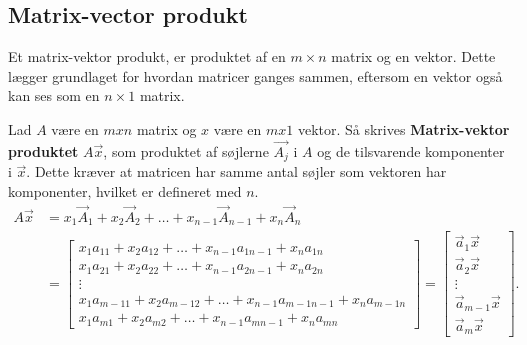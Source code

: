 \subsection{Matrix-vector produkt}
Et matrix-vektor produkt, er produktet af en $m\times n$ matrix og en vektor. Dette lægger grundlaget for hvordan matricer ganges sammen, eftersom en vektor også kan ses som en $n\times1$ matrix. 
\begin{defn}
Lad $A$ være en $mxn$ matrix og $x$ være en $mx1$ vektor. Så skrives \textbf{Matrix-vektor produktet} $A\vec{x}$, som produktet af søjlerne $\vec{A_j}$ i $A$ og de tilsvarende komponenter i $\vec{x}$. Dette kræver at matricen har samme antal søjler som vektoren har komponenter, hvilket er defineret med $n$.
\begin{align*}
A\vec{x}&=x_1\vec{A}_1+x_2\vec{A}_2+ \dots +x_{n-1}\vec{A}_{n-1}+x_n\vec{A}_n \\
&=
\begin{bmatrix}
x_1a_{1 1}+x_2a_{1 2}+\dots +x_{n-1}a_{1 n-1}+x_na_{1 n} \\
x_1a_{2 1}+x_2a_{2 2}+\dots +x_{n-1}a_{2 n-1}+x_na_{2 n}\\
\vdots\\
x_1a_{m-1 1}+x_2a_{m-1 2}+\dots +x_{n-1}a_{m-1 n-1}+x_na_{m-1 n} \\
x_1a_{m 1}+x_2a_{m 2}+\dots +x_{n-1}a_{m n-1}+x_na_{m n}
\end{bmatrix}
=
\begin{bmatrix}
\vec{a}_1\vec{x}\\
\vec{a}_2\vec{x}\\
\vdots\\
\vec{a}_{m-1}\vec{x}\\
\vec{a}_m\vec{x}
\end{bmatrix}.
\end{align*}
\end{defn}
